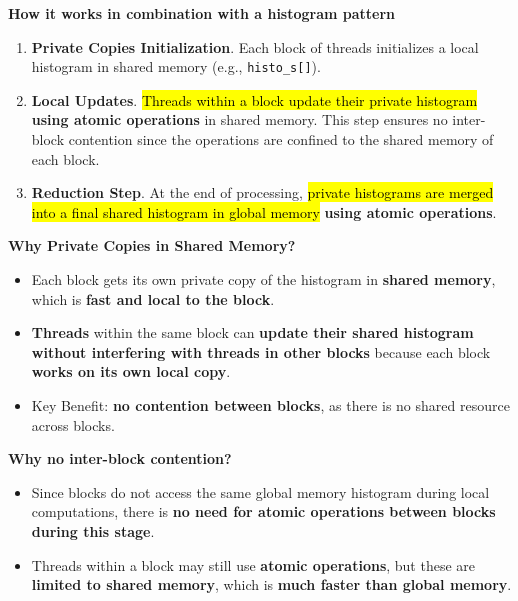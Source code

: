 \begin{itemize}
    \begin{flushleft}
        \textcolor{Green3}{ \textbf{How it works in combination with a histogram pattern}}
    \end{flushleft}
    \begin{enumerate}
        \item \textbf{Private Copies Initialization}. Each block of threads initializes a local histogram in shared memory (e.g., \texttt{histo\_s[]}).
        \item \textbf{Local Updates}. \hl{Threads within a block update their private histogram} \textbf{using atomic operations} in shared memory. This step ensures no inter-block contention since the operations are confined to the shared memory of each block.
        \item \textbf{Reduction Step}. At the end of processing, \hl{private histograms are merged into a final shared histogram in global memory} \textbf{using atomic operations}.
    \end{enumerate}

    \begin{flushleft}
        \textcolor{Green3}{ \textbf{Why Private Copies in Shared Memory?}}
    \end{flushleft}
    \begin{itemize}
        \item Each block gets its own private copy of the histogram in \textbf{shared memory}, which is \textbf{fast and local to the block}.
        \item \textbf{Threads} within the same block can \textbf{update their shared histogram without interfering with threads in other blocks} because each block \textbf{works on its own local copy}.
        \item Key Benefit: \textbf{no contention between blocks}, as there is no shared resource across blocks.
    \end{itemize}

    \begin{flushleft}
        \textcolor{Green3}{ \textbf{Why no inter-block contention?}}
    \end{flushleft}
    \begin{itemize}
        \item Since blocks do not access the same global memory histogram during local computations, there is \textbf{no need for atomic operations between blocks during this stage}.
        \item Threads within a block may still use \textbf{atomic operations}, but these are \textbf{limited to shared memory}, which is \textbf{much faster than global memory}.
    \end{itemize}


\end{itemize}
